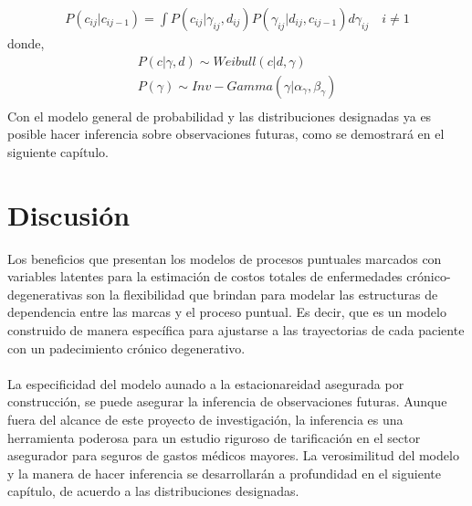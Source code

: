 \begin{align*}
P(c_{ij}|c_{ij-1})=\int P(c_{ij}|\gamma_{ij},d_{ij})P(\gamma_{ij}|d_{ij},c_{ij-1})d\gamma_{ij} \quad i \neq 1
\end{align*}
donde,
\begin{align*}
P(c|\gamma,d) \sim Weibull(c|d,\gamma)\\
P(\gamma) \sim Inv-Gamma(\gamma|\alpha_\gamma,\beta_\gamma)\\
\end{align*}
Con el modelo general de probabilidad y las distribuciones designadas ya es posible hacer inferencia sobre observaciones futuras, como se demostrar\'a en el siguiente cap\'itulo.
\section{Discusi\'on}
Los beneficios que presentan los modelos de procesos puntuales marcados con variables latentes para la estimaci\'on de costos totales de enfermedades cr\'onico-degenerativas son la flexibilidad que brindan para modelar las estructuras de dependencia entre las marcas y el proceso puntual. Es decir, que es un modelo construido de manera espec\'ifica para ajustarse a las trayectorias de cada paciente con un padecimiento cr\'onico degenerativo.\\
\\ 
La especificidad del modelo aunado a la estacionareidad asegurada por construcci\'on, se puede asegurar la inferencia de observaciones futuras. Aunque fuera del alcance de este proyecto de investigaci\'on, la inferencia es una herramienta poderosa para un estudio riguroso de tarificaci\'on en el sector asegurador para seguros de gastos m\'edicos mayores. La verosimilitud del modelo y la manera de hacer inferencia se desarrollar\'an a profundidad en el siguiente cap\'itulo, de acuerdo a las distribuciones designadas.